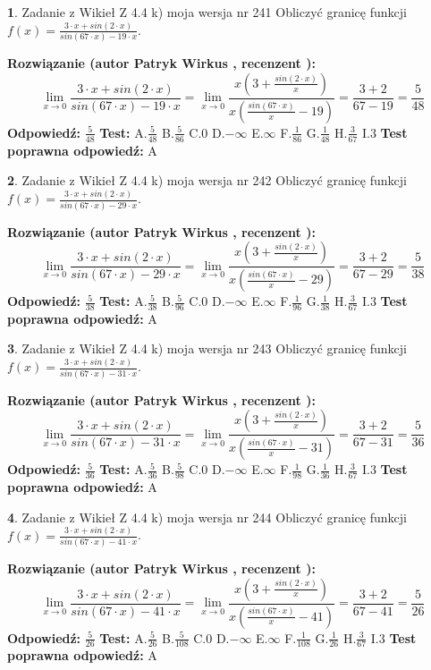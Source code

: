\documentclass[12pt, a4paper]{article}
\theoremstyle{definition} %
\newtheorem{zad}{}
\newcommand{\zadStart}[1]{\begin{zad}#1\newline}
\newcommand{\zadStop}{\end{zad}}
\newcommand{\rozwStart}[2]{\noindent \textbf{Rozwiązanie (autor #1 , recenzent #2): }\newline}
\newcommand{\rozwStop}{\newline}
\newcommand{\odpStart}{\noindent \textbf{Odpowiedź:}\newline}
\newcommand{\odpStop}{\newline}
\newcommand{\testStart}{\noindent \textbf{Test:}\newline}
\newcommand{\testStop}{\newline}
\newcommand{\kluczStart}{\noindent \textbf{Test poprawna odpowiedź:}\newline}
\newcommand{\kluczStop}{\newline}
\begin{document}
\zadStart{Zadanie z Wikieł Z 4.4 k) moja wersja nr 241}
Obliczyć granicę funkcji $f(x)=\frac{3\cdot x +sin(2\cdot x)}{sin(67\cdot x) -19\cdot x}$.
\zadStop
\rozwStart{Patryk Wirkus}{}
$$\lim\limits_{x\to 0}\frac{3\cdot x +sin(2\cdot x)}{sin(67\cdot x) -19\cdot x}
=\lim\limits_{x\to 0}\frac{x(3+\frac{sin(2\cdot x)}{x})}{x(\frac{sin(67\cdot x)}{x}-19)}
=\frac{3+2}{67-19} = \frac{5}{48}$$
\rozwStop
\odpStart
$\frac{5}{48}$
\odpStop
\testStart
A.$\frac{5}{48}$
B.$\frac{5}{86}$
C.$0$
D.$-\infty$
E.$\infty$
F.$\frac{1}{86}$
G.$\frac{1}{48}$
H.$\frac{3}{67}$
I.$3$
\testStop
\kluczStart
A
\kluczStop



\zadStart{Zadanie z Wikieł Z 4.4 k) moja wersja nr 242}
Obliczyć granicę funkcji $f(x)=\frac{3\cdot x +sin(2\cdot x)}{sin(67\cdot x) -29\cdot x}$.
\zadStop
\rozwStart{Patryk Wirkus}{}
$$\lim\limits_{x\to 0}\frac{3\cdot x +sin(2\cdot x)}{sin(67\cdot x) -29\cdot x}
=\lim\limits_{x\to 0}\frac{x(3+\frac{sin(2\cdot x)}{x})}{x(\frac{sin(67\cdot x)}{x}-29)}
=\frac{3+2}{67-29} = \frac{5}{38}$$
\rozwStop
\odpStart
$\frac{5}{38}$
\odpStop
\testStart
A.$\frac{5}{38}$
B.$\frac{5}{96}$
C.$0$
D.$-\infty$
E.$\infty$
F.$\frac{1}{96}$
G.$\frac{1}{38}$
H.$\frac{3}{67}$
I.$3$
\testStop
\kluczStart
A
\kluczStop



\zadStart{Zadanie z Wikieł Z 4.4 k) moja wersja nr 243}
Obliczyć granicę funkcji $f(x)=\frac{3\cdot x +sin(2\cdot x)}{sin(67\cdot x) -31\cdot x}$.
\zadStop
\rozwStart{Patryk Wirkus}{}
$$\lim\limits_{x\to 0}\frac{3\cdot x +sin(2\cdot x)}{sin(67\cdot x) -31\cdot x}
=\lim\limits_{x\to 0}\frac{x(3+\frac{sin(2\cdot x)}{x})}{x(\frac{sin(67\cdot x)}{x}-31)}
=\frac{3+2}{67-31} = \frac{5}{36}$$
\rozwStop
\odpStart
$\frac{5}{36}$
\odpStop
\testStart
A.$\frac{5}{36}$
B.$\frac{5}{98}$
C.$0$
D.$-\infty$
E.$\infty$
F.$\frac{1}{98}$
G.$\frac{1}{36}$
H.$\frac{3}{67}$
I.$3$
\testStop
\kluczStart
A
\kluczStop



\zadStart{Zadanie z Wikieł Z 4.4 k) moja wersja nr 244}
Obliczyć granicę funkcji $f(x)=\frac{3\cdot x +sin(2\cdot x)}{sin(67\cdot x) -41\cdot x}$.
\zadStop
\rozwStart{Patryk Wirkus}{}
$$\lim\limits_{x\to 0}\frac{3\cdot x +sin(2\cdot x)}{sin(67\cdot x) -41\cdot x}
=\lim\limits_{x\to 0}\frac{x(3+\frac{sin(2\cdot x)}{x})}{x(\frac{sin(67\cdot x)}{x}-41)}
=\frac{3+2}{67-41} = \frac{5}{26}$$
\rozwStop
\odpStart
$\frac{5}{26}$
\odpStop
\testStart
A.$\frac{5}{26}$
B.$\frac{5}{108}$
C.$0$
D.$-\infty$
E.$\infty$
F.$\frac{1}{108}$
G.$\frac{1}{26}$
H.$\frac{3}{67}$
I.$3$
\testStop
\kluczStart
A
\kluczStop
\end{document}
